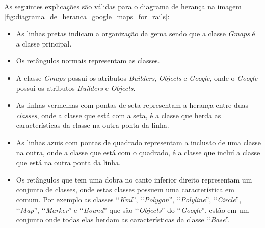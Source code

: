 As seguintes explicações são válidas para o diagrama de herança na imagem
\ref{fig:diagrama_de_heranca_google_maps_for_rails}:

\begin{itemize}

 \item As linhas pretas indicam a organização da gema sendo que a classe \emph{Gmaps} é a classe principal.
 
 \item Os retângulos normais representam as classes.
 
 \item A classe \emph{Gmaps} possui os atributos \emph{Builders}, \emph{Objects} e 
 \emph{Google}, onde o \emph{Google} possui os atributos \emph{Builders} e \emph{Objects}.
 
 \item As linhas vermelhas com pontas de seta representam a herança entre duas \emph{classes}, onde 
 a classe que está com a seta, é a classe que herda as características da classe
 na outra ponta da linha.

 \item As linhas azuis com pontas de quadrado representam a inclusão de uma classe na outra, onde
 a classe que está com o quadrado, é a classe que incluí a classe que está na outra ponta da linha.
 
  \item Os retângulos que tem uma dobra no canto inferior direito representam um conjunto de classes, 
 onde estas classes possuem uma característica em comum. Por exemplo as classes ‘‘\emph{Kml}'', 
 ‘‘\emph{Polygon}'', ‘‘\emph{Polyline}'', ‘‘\emph{Circle}'', ‘‘\emph{Map}'', ‘‘\emph{Marker}'' e 
 ‘‘\emph{Bound}'' que são ‘‘\emph{Objects}'' do ‘‘\emph{Google}'', estão em um conjunto onde todas elas 
 herdam as características da classe ‘‘\emph{Base}''.
 
 \end{itemize}
 
